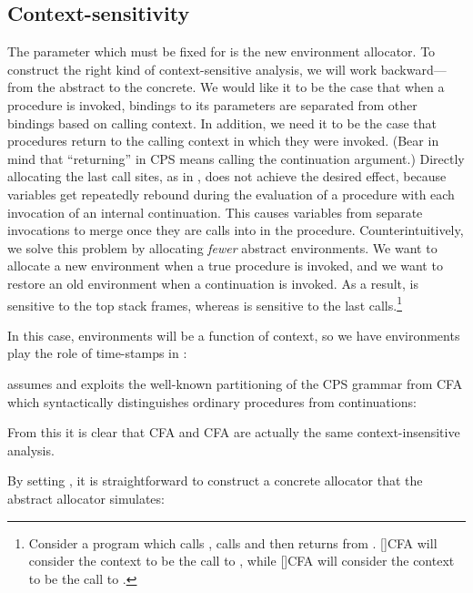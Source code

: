 \subsection{Context-sensitivity}
The parameter which must be fixed for \nCFA{} is the new 
environment allocator.
To construct the right kind of context-sensitive analysis, we will
work backward---from the abstract to the concrete.
We would like it to be the case that when a procedure is invoked,
bindings to its parameters are separated from other bindings based on
calling context.
In addition, we need it to be the case that procedures return to the
calling context in which they were invoked.
(Bear in mind that ``returning'' in CPS means calling the 
continuation argument.)
Directly allocating the last  call sites, as in \kCFA, does not
achieve the desired effect, because variables get repeatedly rebound
during the evaluation of a procedure with each invocation of an
internal continuation.
This causes variables from separate invocations to merge once 
they are  calls into in the procedure.
Counterintuitively, we solve this problem by allocating \emph{fewer}
abstract environments.
We want to allocate a new environment when a true procedure is invoked, and
we want to restore an old environment when a continuation is invoked.
As a result, \nCFA{} is sensitive to the top  stack frames, whereas
\kCFA{} is sensitive to the last  calls.\footnote{ Consider a
  program which calls , calls  and then returns from .
  []CFA will consider the context to be the call to , while []CFA
  will consider the context to be the call to .}



In this case, environments will be a function of context, so we have
environments play the role of time-stamps in \kCFA:
\begin{small}\end{small}\nCFA{} assumes and exploits the well-known partitioning of the CPS
grammar from CFA \cite{dvanhorn:Might:2006:DeltaCFA} which
syntactically distinguishes ordinary procedures from continuations:
\begin{small}\end{small}From this it is clear that CFA and CFA are actually the
same context-insensitive analysis.


By setting , it is straightforward
to construct a concrete allocator that the abstract allocator simulates:
\begin{small}\end{small}



